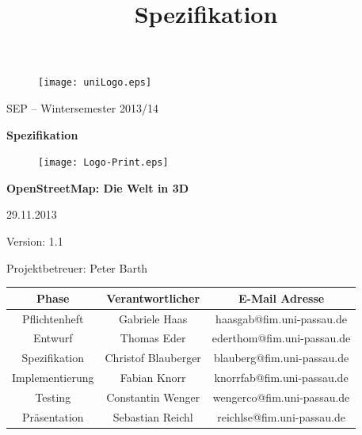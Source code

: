 \documentclass[10pt]{scrreprt}
\begin{document}
\thispagestyle{empty}
\sffamily
 
\title{Spezifikation}

\begin{figure}
\begin{flushright}
	\texttt{[image: uniLogo.eps]}
\vspace{2.0 cm}
\end{flushright}
\end{figure}

\begin{center}
\vspace{2.0 cm}
{\LARGE SEP – Wintersemester 2013/14}

\vspace{1.0 cm}
\textbf{{\Huge Spezifikation}}

\vspace{0.4 cm}
\begin{figure}[!htb]
\begin{center}
	\texttt{[image: Logo-Print.eps]}
\end{center}
\end{figure}

\vspace{0.2 cm}
\textbf{{\huge OpenStreetMap: Die Welt in 3D}}

\vspace{1.5 cm}
29.11.2013

\vspace{0.5 cm}
Version: 1.1

\vspace{1.5 cm}
{\Large Projektbetreuer: Peter Barth}

\vspace{1.5 cm}
\begin{tabular}{|c|c|c|}
\hline 
\rule[-1ex]{0pt}{4ex} \textbf{Phase} & \textbf{Verantwortlicher} & \textbf{E-Mail Adresse} \\ 
\hline  \hline
\rule[-1ex]{0pt}{4ex} Pflichtenheft & Gabriele Haas & haasgab@fim.uni-passau.de \\ 
\hline  \hline
\rule[-1ex]{0pt}{4ex} Entwurf & Thomas Eder & ederthom@fim.uni-passau.de \\ 
\hline  \hline
\rule[-1ex]{0pt}{4ex} Spezifikation & Christof Blauberger & blauberg@fim.uni-passau.de \\ 
\hline  \hline
\rule[-1ex]{0pt}{4ex} Implementierung & Fabian Knorr & knorrfab@fim.uni-passau.de \\ 
\hline \hline 
\rule[-1ex]{0pt}{4ex} Testing & Constantin Wenger & wengerco@fim.uni-passau.de \\ 
\hline  \hline
\rule[-1ex]{0pt}{4ex} Präsentation & Sebastian Reichl & reichlse@fim.uni-passau.de \\ 
\hline 
\end{tabular}

\end{center}
\end{document}
